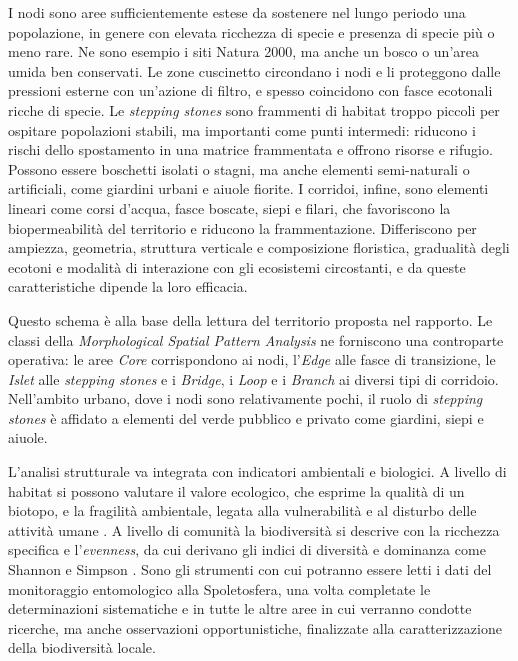 \documentclass[
  a4paper,
]{book}
\begin{document}
I nodi sono aree sufficientemente estese da sostenere nel lungo periodo una popolazione, in genere con elevata ricchezza di specie e presenza di specie più o meno rare.
Ne sono esempio i siti Natura 2000, ma anche un bosco o un'area umida ben conservati.
Le zone cuscinetto circondano i nodi e li proteggono dalle pressioni esterne con un'azione di filtro, e spesso coincidono con fasce ecotonali ricche di specie.
Le \emph{stepping stones} sono frammenti di habitat troppo piccoli per ospitare popolazioni stabili, ma importanti come punti intermedi: riducono i rischi dello spostamento in una matrice frammentata e offrono risorse e rifugio.
Possono essere boschetti isolati o stagni, ma anche elementi semi-naturali o artificiali, come giardini urbani e aiuole fiorite.
I corridoi, infine, sono elementi lineari come corsi d'acqua, fasce boscate, siepi e filari, che favoriscono la biopermeabilità del territorio e riducono la frammentazione.
Differiscono per ampiezza, geometria, struttura verticale e composizione floristica, gradualità degli ecotoni e modalità di interazione con gli ecosistemi circostanti, e da queste caratteristiche dipende la loro efficacia.

Questo schema è alla base della lettura del territorio proposta nel rapporto.
Le classi della \emph{Morphological Spatial Pattern Analysis} ne forniscono una controparte operativa: le aree \emph{Core} corrispondono ai nodi, l'\emph{Edge} alle fasce di transizione, le \emph{Islet} alle \emph{stepping stones} e i \emph{Bridge}, i \emph{Loop} e i \emph{Branch} ai diversi tipi di corridoio.
Nell'ambito urbano, dove i nodi sono relativamente pochi, il ruolo di \emph{stepping stones} è affidato a elementi del verde pubblico e privato come giardini, siepi e aiuole.

L'analisi strutturale va integrata con indicatori ambientali e biologici.
A livello di habitat si possono valutare il valore ecologico, che esprime la qualità di un biotopo, e la fragilità ambientale, legata alla vulnerabilità e al disturbo delle attività umane \citep{angelini2009}.
A livello di comunità la biodiversità si descrive con la ricchezza specifica e l'\emph{evenness}, da cui derivano gli indici di diversità e dominanza come Shannon e Simpson \citep{magurran2004}.
Sono gli strumenti con cui potranno essere letti i dati del monitoraggio entomologico alla Spoletosfera, una volta completate le determinazioni sistematiche e in tutte le altre aree in cui verranno condotte ricerche, ma anche osservazioni opportunistiche, finalizzate alla caratterizzazione della biodiversità locale.
\end{document}
